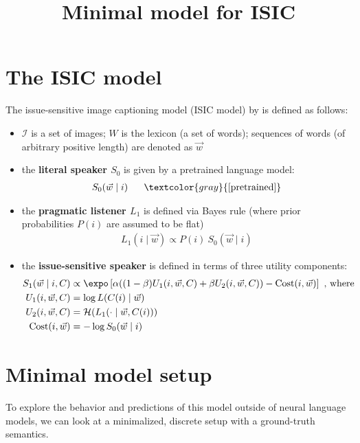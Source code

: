 \documentclass[fleqn,reqno,10pt]{article}
\title{Minimal model for ISIC}
\author{}
\date{}
\begin{document}
\thispagestyle{empty}

\section{The ISIC model}

The issue-sensitive image captioning model (ISIC model) by \cite{NieCohn-Gordon2020:Pragmatic-Issue} is defined as follows:

\begin{itemize}
  \item $\mathcal{I}$ is a set of images; $W$ is the lexicon (a set of words); sequences of words (of arbitrary positive length) are denoted as $\vec{w}$
  \item the \textbf{literal speaker $S_{0}$} is given by a pretrained language model:
        \begin{align*}
          S_0(\vec{w} \mid i) \ \ \ \ \ \textcolor{gray}{\text{[pretrained]}}
        \end{align*}
  \item the \textbf{pragmatic listener $L_{1}$} is defined via Bayes rule (where prior probabilities $P(i)$ are assumed to be flat)
        \begin{align*}
          L_1(i \mid \vec{w}) \propto P(i) \ S_0(\vec{w} \mid i)
        \end{align*}
  \item the \textbf{issue-sensitive speaker} is defined in terms of three utility components:
        \begin{align*}
          S_{1}(\vec{w} \mid i, C) & \propto \expo \left [  \alpha ((1-\beta) U_1(i, \vec{w}, C) + \beta U_2(i, \vec{w}, C)) - \text{Cost}(i, \vec{w}) \right ] \ \text{, where}
          \\
          U_1(i, \vec{w}, C) & = \log L(C(i) \mid \vec{w})
          \\
          U_2(i, \vec{w}, C) & = \mathcal{H} ( L_{1}(\cdot \mid \vec{w} , C(i)) )
          \\
          \text{Cost}(i, \vec{w}) & = - \log S_0 (\vec{w} \mid i)
        \end{align*}
\end{itemize}

\section{Minimal model setup}

To explore the behavior and predictions of this model outside of neural language models, we can look at a minimalized, discrete setup with a ground-truth semantics.
\end{document}
